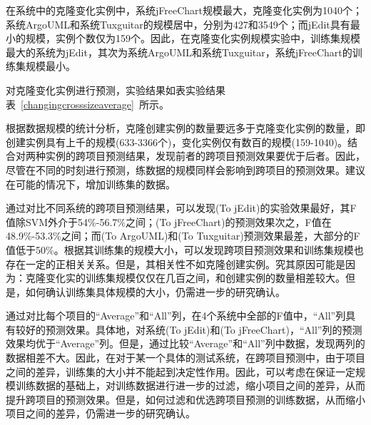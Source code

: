 在系统中的克隆变化实例中，系统jFreeChart规模最大，克隆变化实例为1040个；系统ArgoUML和系统Tuxguitar的规模居中，分别为427和3549个；而jEdit具有最小的规模，实例个数仅为159个。因此，在克隆变化实例规模实验中，训练集规模最大的系统为jEdit，其次为系统ArgoUML和系统Tuxguitar，系统jFreeChart的训练集规模最小。

对克隆变化实例进行预测，实验结果如表实验结果表~\ref{changingcrosssizeaverage}~所示。

根据数据规模的统计分析，克隆创建实例的数量要远多于克隆变化实例的数量，即创建实例具有上千的规模(633-3366个)，变化实例仅有数百的规模(159-1040)。结合对两种实例的跨项目预测结果，发现前者的跨项目预测效果要优于后者。因此，尽管在不同的时刻进行预测，练数据的规模同样会影响到跨项目的预测效果。建议在可能的情况下，增加训练集的数据。

通过对比不同系统的跨项目预测结果，可以发现(To jEdit)的实验效果最好，其F值除SVM外介于54\%-56.7\%之间；(To jFreeChart)的预测效果次之，F值在48.9\%-53.3\%之间；而(To ArgoUML)和(To Tuxguitar)预测效果最差，大部分的F值低于50\%。根据其训练集的规模大小，可以发现跨项目预测效果和训练集规模也存在一定的正相关关系。但是，其相关性不如克隆创建实例。究其原因可能是因为：克隆变化实的训练集规模仅仅在几百之间，和创建实例的数量相差较大。但是，如何确认训练集具体规模的大小，仍需进一步的研究确认。

通过对比每个项目的“Average”和“All”列，在4个系统中全部的F值中，“All”列具有较好的预测效果。具体地，对系统(To jEdit)和(To jFreeChart)，“All”列的预测效果均优于“Average”列。但是，通过比较“Average”和“All”列中数据，发现两列的数据相差不大。因此，在对于某一个具体的测试系统，在跨项目预测中，由于项目之间的差异，训练集的大小并不能起到决定性作用。因此，可以考虑在保证一定规模训练数据的基础上，对训练数据进行进一步的过滤，缩小项目之间的差异，从而提升跨项目的预测效果。但是，如何过滤和优选跨项目预测的训练数据，从而缩小项目之间的差异，仍需进一步的研究确认。


